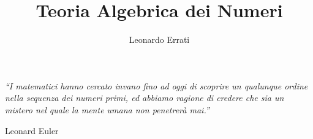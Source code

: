 \documentclass[a4paper,twoside]{book}
\begin{document}
	\frontmatter
	\title{\textbf{Teoria Algebrica dei Numeri}}
	\author{Leonardo Errati}
	\date{}
	\maketitle
	
		\epigraph{\textit{\enquote{I matematici hanno cercato invano fino ad oggi di scoprire un qualunque ordine nella sequenza dei numeri primi, ed abbiamo ragione di credere che sia un mistero nel quale la mente umana non penetrerà mai.}}}{Leonard Euler}
	
	\tableofcontents
	
	
	
	\mainmatter
	
	
	
	\appendix
	
	
	
	
	
	
\end{document}

